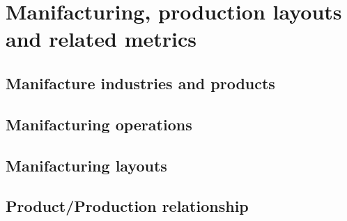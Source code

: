 \chapter{Manifacturing, production layouts and related metrics}

\section{Manifacture industries and products}
\section{Manifacturing operations}
\section{Manifacturing layouts}
\section{Product/Production relationship}

